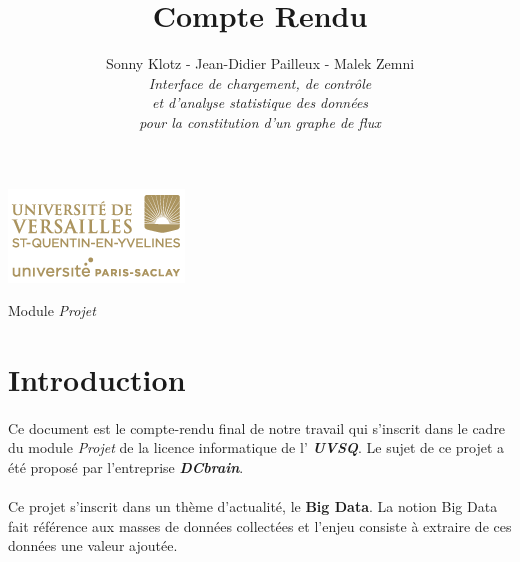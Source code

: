 

\title{\vspace{\fill}\textbf{\Huge Compte Rendu}}
\author{
	Sonny Klotz - Jean-Didier Pailleux - Malek Zemni
	\vspace{2em}\\
	\textit{Interface de chargement, de contrôle}\\\textit{et d’analyse statistique des données}\\\textit{pour la constitution d’un graphe de flux}
	\vspace{2em}
}


\clearpage
\maketitle\vspace{9em}
\begin{center}\includegraphics[scale=0.7]{../Cahier/logo.png}\end{center}
\begin{flushright}Module \textit{Projet}\end{flushright}
\newpage
\tableofcontents
\newpage\clearpage{}

	\section*{Introduction}
	\paragraph{}Ce document est le compte-rendu final de notre travail qui s'inscrit dans le cadre du module \textit{Projet} de la licence informatique de l' \textit{\textbf{UVSQ}}. Le sujet de ce projet a été proposé par l'entreprise \textit{\textbf{DCbrain}}.
	\paragraph{}Ce projet s’inscrit dans un thème d’actualité, le \textbf{Big Data}. La notion Big Data fait référence aux masses de données collectées et l'enjeu consiste à extraire de ces données une valeur ajoutée.

